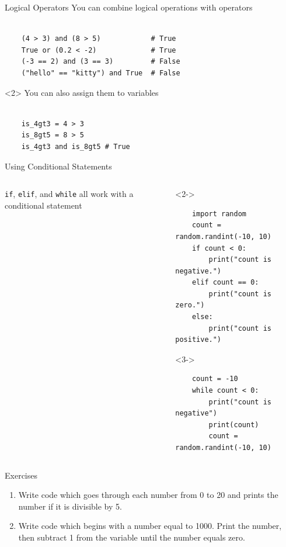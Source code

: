 \documentclass{beamer}
\begin{document}
\begin{frame}[fragile]{Logical Operators}
You can combine logical operations with operators
\begin{verbatim}

    (4 > 3) and (8 > 5)            # True
    True or (0.2 < -2)             # True
    (-3 == 2) and (3 == 3)         # False
    ("hello" == "kitty") and True  # False
\end{verbatim}

\begin{block}{}<2>
You can also assign them to variables
\begin{verbatim}

    is_4gt3 = 4 > 3
    is_8gt5 = 8 > 5
    is_4gt3 and is_8gt5 # True
\end{verbatim}
\end{block}
\end{frame}

\begin{frame}[fragile]{Using Conditional Statements}
    \begin{columns}
        \begin{column}{0.3\textwidth}
            \texttt{if}, \texttt{elif}, and \texttt{while} all work with a conditional statement
        \end{column}
        \begin{column}{0.7\textwidth}
        \footnotesize

\begin{block}{}<2->
\begin{verbatim}
    import random
    count = random.randint(-10, 10)
    if count < 0:
        print("count is negative.")
    elif count == 0:
        print("count is zero.")
    else: 
        print("count is positive.")
\end{verbatim}
\end{block}
\vspace*{-1em}
\begin{block}{}<3->
\begin{verbatim}
    count = -10
    while count < 0:
        print("count is negative")
        print(count)
        count = random.randint(-10, 10)
\end{verbatim}
\end{block}
        \end{column}
    \end{columns}
\end{frame}

\begin{frame}{Exercises}
    \begin{enumerate}
        \item Write code which goes through each number from 0 to 20 and prints the number if it is divisible by 5.
        \item Write code which begins with a number equal to 1000. Print the number, then subtract 1 from the variable until the number equals zero. 
    \end{enumerate}
\end{frame}
\end{document}
